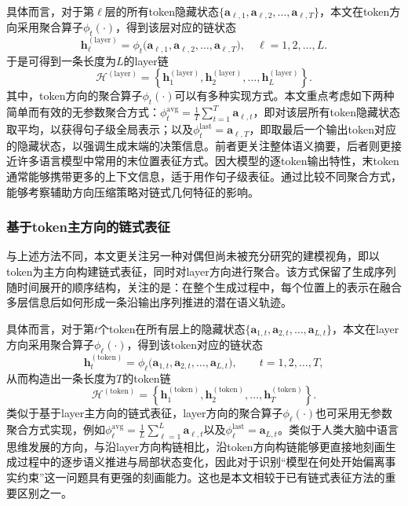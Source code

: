 具体而言，对于第$\ell$层的所有token隐藏状态$\{\mathbf{a}_{\ell,1},\mathbf{a}_{\ell,2},\dots,\mathbf{a}_{\ell,T}\}$，本文在token方向采用聚合算子$\phi_t(\cdot)$，得到该层对应的链状态
\begin{equation}
  \mathbf{h}^{(\mathrm{layer})}_{\ell} = \phi_t\big(\mathbf{a}_{\ell,1},\mathbf{a}_{\ell,2},\dots,\mathbf{a}_{\ell,T}\big), \quad \ell = 1,2,\dots,L.
\end{equation}
于是可得到一条长度为$L$的layer链
\begin{equation}
  \mathcal{H}^{(\mathrm{layer})}
  =
  \left\{
  \mathbf{h}^{(\mathrm{layer})}_{1},
  \mathbf{h}^{(\mathrm{layer})}_{2},
  \dots,
  \mathbf{h}^{(\mathrm{layer})}_{L}
  \right\}.
\end{equation}
其中，token方向的聚合算子$\phi_t(\cdot)$可以有多种实现方式。本文重点考虑如下两种简单而有效的无参数聚合方式：$\phi_t^{\mathrm{avg}}=\frac{1}{T}\sum_{t=1}^{T}\mathbf{a}_{\ell,t}$，即对该层所有token隐藏状态取平均，以获得句子级全局表示；以及$\phi_t^{\mathrm{last}}=\mathbf{a}_{\ell,T}$，即取最后一个输出token对应的隐藏状态，以强调生成末端的决策信息。前者更关注整体语义摘要，后者则更接近许多语言模型中常用的末位置表征方式。因大模型的逐token输出特性，末token通常能够携带更多的上下文信息，适于用作句子级表征。通过比较不同聚合方式，能够考察辅助方向压缩策略对链式几何特征的影响。

\subsubsection{基于token主方向的链式表征}

与上述方法不同，本文更关注另一种对偶但尚未被充分研究的建模视角，即以token为主方向构建链式表征，同时对layer方向进行聚合。该方式保留了生成序列随时间展开的顺序结构，关注的是：在整个生成过程中，每个位置上的表示在融合多层信息后如何形成一条沿输出序列推进的潜在语义轨迹。

具体而言，对于第$t$个token在所有层上的隐藏状态$\{\mathbf{a}_{1,t},\mathbf{a}_{2,t},\dots,\mathbf{a}_{L,t}\}$，本文在layer方向采用聚合算子$\phi_{\ell}(\cdot)$，得到该token对应的链状态
\begin{equation}
  \mathbf{h}^{(\mathrm{token})}_{t}
  =
  \phi_{\ell}\big(\mathbf{a}_{1,t},\mathbf{a}_{2,t},\dots,\mathbf{a}_{L,t}\big), \qquad t = 1,2,\dots,T,
\end{equation}
从而构造出一条长度为$T$的token链
\begin{equation}
  \mathcal{H}^{(\mathrm{token})}
  =
  \left\{
  \mathbf{h}^{(\mathrm{token})}_{1},
  \mathbf{h}^{(\mathrm{token})}_{2},
  \dots,
  \mathbf{h}^{(\mathrm{token})}_{T}
  \right\}.
\end{equation}
类似于基于layer主方向的链式表征，layer方向的聚合算子$\phi_{\ell}(\cdot)$也可采用无参数聚合方式实现，例如$\phi_{\ell}^{\mathrm{avg}}=\frac{1}{L}\sum_{\ell=1}^{L}\mathbf{a}_{\ell,t}$以及$\phi_{\ell}^{\mathrm{last}}=\mathbf{a}_{L,t}$。类似于人类大脑中语言思维发展的方向，与沿layer方向构链相比，沿token方向构链能够更直接地刻画生成过程中的逐步语义推进与局部状态变化，因此对于识别“模型在何处开始偏离事实约束”这一问题具有更强的刻画能力。这也是本文相较于已有链式表征方法的重要区别之一。

